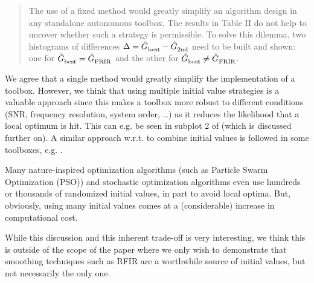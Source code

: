 
\newcommand{\reviewer}[1]{\paragraph{#1}}



\begin{quote}

The use of a fixed method would greatly simplify an algorithm design in any standalone autonomous toolbox. The results in Table II do not help to uncover whether such a strategy is permissible. To solve this dilemma, two histograms of differences $\Delta = \hat{G}_{\mathrm{best}}^{\mathrm{}} - \hat{G}_{\mathrm{2nd}}^{\mathrm{}}$ need to be built and shown: one for $\hat{G}_{\mathrm{best}}^{\mathrm{}} = \hat{G}_{\mathrm{FRIR}}^{\mathrm{}}$ and the other for $\hat{G}_{\mathrm{best}}^{\mathrm{}} \neq \hat{G}_{\mathrm{FRIR}}^{\mathrm{}}$.
\end{quote}

We agree that a single method would greatly simplify the implementation of a toolbox.
However, we think that using multiple initial value strategies is a valuable approach since this makes a toolbox more robust to different conditions (SNR, frequency resolution, system order, \ldots) as it reduces the likelihood that a local optimum is hit.
This can e.g. be seen in subplot 2 of  (which is discussed further on).
A similar approach w.r.t. to combine initial values is followed in some toolboxes, e.g. \cite{FDIDENT,TDIDENT}.

Many nature-inspired optimization algorithms (such as Particle Swarm Optimization (PSO)) and stochastic optimization algorithms even use hundreds or thousands of randomized initial values, in part to avoid local optima.
But, obviously, using many initial values comes at a (considerable) increase in computational cost.

While this discussion and this inherent trade-off is very interesting, we think this is outside of the scope of the paper where we only wish to demonstrate that smoothing techniques such as RFIR are a worthwhile source of initial values, but not necessarily the only one.
